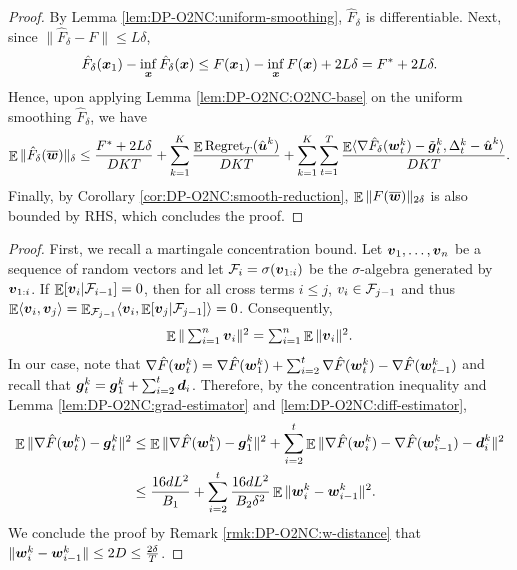 
\begin{proof}
By Lemma \ref{lem:DP-O2NC:uniform-smoothing}, $\hat F_\delta$ is differentiable. Next, since $\|\hat F_\delta - F\| \le L\delta$, 
\begin{equation*}
    \hat F_\delta({\boldsymbol{x}}_1) - \inf_{\boldsymbol{x}} \hat F_\delta({\boldsymbol{x}})
    \le F({\boldsymbol{x}}_1) - \inf_{\boldsymbol{x}} F({\boldsymbol{x}}) + 2L\delta = F^* + 2L\delta.
\end{equation*}
Hence, upon applying Lemma \ref{lem:DP-O2NC:O2NC-base} on the uniform smoothing $\hat F_\delta$, we have
\begin{equation*}
    \mathop{\mathbb{E}}\|\hat F_\delta(\overline{{\boldsymbol{w}}})\|_\delta \le 
    \frac{F^*+2L\delta}{DKT} + \sum_{k=1}^K\frac{\mathop{\mathbb{E}}\mathrm{Regret}_T(\hat{{\boldsymbol{u}}}^k)}{DKT} + \sum_{k=1}^K\sum_{t=1}^T \frac{ \mathop{\mathbb{E}}\langle \nabla\hat F_\delta({\boldsymbol{w}}_t^k)-\tilde{{\boldsymbol{g}}}_t^k, \Delta_t^k-\hat{{\boldsymbol{u}}}^k\rangle }{DKT}.
\end{equation*}
Finally, by Corollary \ref{cor:DP-O2NC:smooth-reduction}, $\mathop{\mathbb{E}}\|F(\overline{{\boldsymbol{w}}})\|_{2\delta}$ is also bounded by RHS, which concludes the proof.
\end{proof}



\begin{proof}
First, we recall a martingale concentration bound. Let ${\boldsymbol{v}}_1,\ldots,{\boldsymbol{v}}_n$ be a sequence of random vectors and let ${\cal F}_i=\sigma({\boldsymbol{v}}_{1:i})$ be the $\sigma$-algebra generated by ${\boldsymbol{v}}_{1:i}$. If $\mathop{\mathbb{E}}[{\boldsymbol{v}}_i|{\cal F}_{i-1}] = 0$, then for all cross terms $i\le j$, $v_i\in{\cal F}_{j-1}$ and thus $\mathop{\mathbb{E}}\langle {\boldsymbol{v}}_i, {\boldsymbol{v}}_j\rangle = \mathop{\mathbb{E}}_{{\cal F}_{j-1}}\langle {\boldsymbol{v}}_i, \mathop{\mathbb{E}}[{\boldsymbol{v}}_j|{\cal F}_{j-1}]\rangle = 0$. Consequently,
\begin{equation*}
    \textstyle
    \mathop{\mathbb{E}}\|\sum_{i=1}^n {\boldsymbol{v}}_i\|^2 = \sum_{i=1}^n \mathop{\mathbb{E}}\|{\boldsymbol{v}}_i\|^2.
\end{equation*}
In our case, note that $\nabla\hat F({\boldsymbol{w}}_t^k) = \nabla\hat F({\boldsymbol{w}}_1^k) + \sum_{i=2}^t \nabla\hat F({\boldsymbol{w}}_t^k) - \nabla\hat F({\boldsymbol{w}}_{t-1}^k)$ and recall that ${\boldsymbol{g}}_t^k = {\boldsymbol{g}}_1^k + \sum_{i=2}^t {\boldsymbol{d}}_i$. Therefore, by the concentration inequality and Lemma \ref{lem:DP-O2NC:grad-estimator} and \ref{lem:DP-O2NC:diff-estimator}, 
\begin{align*}
    \mathop{\mathbb{E}}\| \nabla \hat F({\boldsymbol{w}}_t^k) - {\boldsymbol{g}}_t^k \|^2
    &\le \mathop{\mathbb{E}}\|\nabla \hat F({\boldsymbol{w}}_1^k) - {\boldsymbol{g}}_1^k\|^2 + \sum_{i=2}^t \mathop{\mathbb{E}}\|\nabla\hat F({\boldsymbol{w}}_i^k)-\nabla\hat F({\boldsymbol{w}}_{i-1}^k) - {\boldsymbol{d}}_i^k\|^2 \\
    &\le \frac{16dL^2}{B_1} + \sum_{i=2}^t \frac{16dL^2}{B_2\delta^2} \mathop{\mathbb{E}}\|{\boldsymbol{w}}_i^k-{\boldsymbol{w}}_{i-1}^k\|^2.
\end{align*}
We conclude the proof by Remark \ref{rmk:DP-O2NC:w-distance} that $\|{\boldsymbol{w}}_i^k-{\boldsymbol{w}}_{i-1}^k\| \le 2D \le \frac{2\delta}{T}$.
\end{proof}